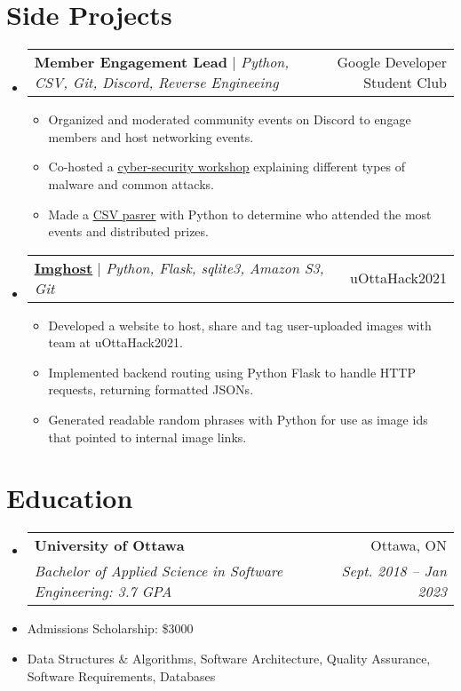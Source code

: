 \documentclass[letterpaper,11pt]{article}
\makeatletter
\newcommand{\resumeItem}[1]{
  \item\small{
    {#1 \vspace{-2pt}}
  }
}
\newcommand{\resumeSubheading}[4]{
  \vspace{-2pt}\item
    \begin{tabular*}{0.97\textwidth}[t]{l@{\extracolsep{\fill}}r}
      \textbf{#1} & #2 \\
      \textit{\small#3} & \textit{\small #4} \\
    \end{tabular*}\vspace{-7pt}
}
\newcommand{\resumeProjectHeading}[2]{
    \item
    \begin{tabular*}{0.97\textwidth}{l@{\extracolsep{\fill}}r}
      \small#1 & #2 \\
    \end{tabular*}\vspace{-7pt}
}
\newcommand{\resumeSubHeadingListStart}{\begin{itemize}[leftmargin=0.15in, label={}]}
\newcommand{\resumeSubHeadingListEnd}{\end{itemize}}
\newcommand{\resumeItemListStart}{\begin{itemize}}
\newcommand{\resumeItemListEnd}{\end{itemize}\vspace{-5pt}}
\makeatother
\begin{document}
\section{Side Projects}
    \resumeSubHeadingListStart
      \resumeProjectHeading
          {\textbf{Member Engagement Lead} $|$ \emph{Python, CSV, Git, Discord, Reverse Engineeing}}{Google Developer Student Club}
          \resumeItemListStart
            \resumeItem{Organized and moderated community events on Discord to engage members and host networking events.}
            \resumeItem{Co-hosted a \href{https://www.youtube.com/watch?v=CBb6tFfmoBI}{\underline{cyber-security workshop}} explaining different types of malware and common attacks.}
            \resumeItem{Made a \href{https://github.com/GregMitch/Attendance-Checker}{\underline{CSV pasrer}} with Python to determine who attended the most events and distributed prizes.}
          \resumeItemListEnd
      \resumeProjectHeading
          {\textbf{\href{https://github.com/The-Homiesexuals/imghost/commits/master?author=GregMitch}{\underline{Imghost}}} $|$ \emph{Python, Flask, sqlite3, Amazon S3, Git}}{uOttaHack2021}
          \resumeItemListStart
            \resumeItem{Developed a website to host, share and tag user-uploaded images with team at uOttaHack2021.}
            \resumeItem{Implemented backend routing using Python Flask to handle HTTP requests, returning formatted JSONs.}
            \resumeItem{Generated readable random phrases with Python for use as image ids that pointed to internal image links.}
          \resumeItemListEnd
    \resumeSubHeadingListEnd


\section{Education}
\resumeSubHeadingListStart
  \resumeSubheading
    {University of Ottawa}{Ottawa, ON}
    {Bachelor of Applied Science in Software Engineering: 3.7 GPA}{Sept. 2018 -- Jan 2023}
\resumeSubHeadingListEnd
\resumeItemListStart
  \resumeItem{Admissions Scholarship: \$3000}
  \resumeItem{Data Structures \& Algorithms, Software Architecture, Quality Assurance, Software Requirements, Databases}
\resumeItemListEnd

\end{document}
